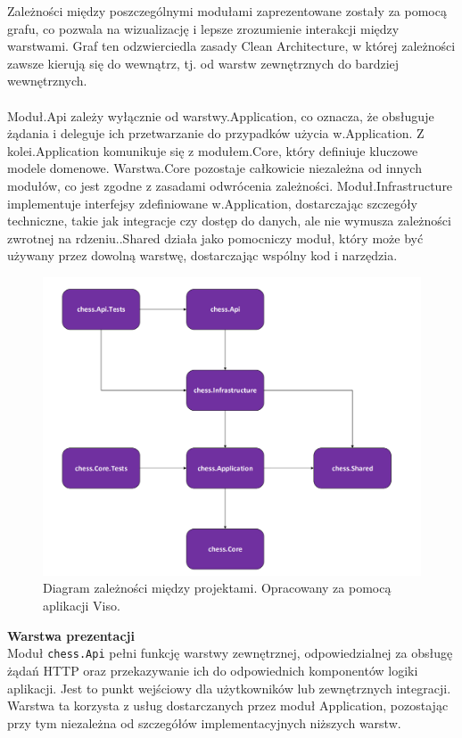 \documentclass[twoside]{projektInzynierskiMS1}
\begin{document}
\newpage

\noindent
Zależności między poszczególnymi modułami zaprezentowane zostały za pomocą grafu, co pozwala na wizualizację i lepsze zrozumienie interakcji między warstwami. Graf ten odzwierciedla zasady Clean Architecture, w której zależności zawsze kierują się do wewnątrz, tj. od warstw zewnętrznych do bardziej wewnętrznych.
\\\\
Moduł.Api zależy wyłącznie od warstwy.Application, co oznacza, że obsługuje żądania i deleguje ich przetwarzanie do przypadków użycia w.Application. Z kolei.Application komunikuje się z modułem.Core, który definiuje kluczowe modele domenowe. Warstwa.Core pozostaje całkowicie niezależna od innych modułów, co jest zgodne z zasadami odwrócenia zależności. Moduł.Infrastructure implementuje interfejsy zdefiniowane w.Application, dostarczając szczegóły techniczne, takie jak integracje czy dostęp do danych, ale nie wymusza zależności zwrotnej na rdzeniu..Shared działa jako pomocniczy moduł, który może być używany przez dowolną warstwę, dostarczając wspólny kod i narzędzia.

\vspace{0.5cm}
\begin{figure}[h!]
    \centering
    \includegraphics[width=1\textwidth]{images/diagram_dependencies.png}
    \caption{Diagram zależności między projektami. Opracowany za pomocą aplikacji Viso.}
\end{figure}

\newpage

\noindent \textbf{Warstwa prezentacji}\\
Moduł \texttt{chess.Api} pełni funkcję warstwy zewnętrznej, odpowiedzialnej za obsługę żądań HTTP oraz przekazywanie ich do odpowiednich komponentów logiki aplikacji. Jest to punkt wejściowy dla użytkowników lub zewnętrznych integracji. Warstwa ta korzysta z usług dostarczanych przez moduł Application, pozostając przy tym niezależna od szczegółów implementacyjnych niższych warstw.
\end{document}
